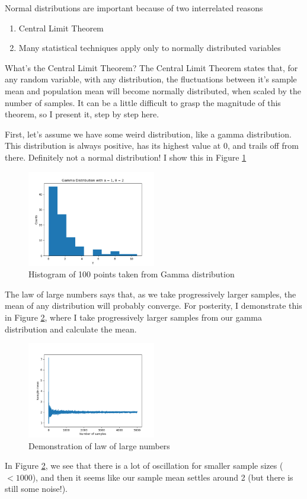 \documentclass{article}
\begin{document}
\clearpage
Normal distributions are important because of two interrelated reasons
\begin{enumerate}
\item\label{item:3} Central Limit Theorem
\item Many statistical techniques apply only to normally distributed variables
\end{enumerate}

What's the Central Limit Theorem? The Central Limit Theorem states that, for any random variable, with any distribution, the fluctuations between it's sample mean and population mean will become normally distributed, when scaled by the number of samples. It can be a little difficult to grasp the magnitude of this theorem, so I present it, step by step here. 

First, let's assume we have some weird distribution, like a gamma distribution. This distribution is always positive, has its highest value at 0, and trails off from there. Definitely not a normal distribution! I show this in Figure \ref{fig:gamma}
\begin{figure}[htbp]
\centerline{\includegraphics[width = 0.5\textwidth]{gamma.png}}
\caption[]{\label{fig:gamma} Histogram of 100 points taken from Gamma distribution}
\end{figure}

The law of large numbers says that, as we take progressively larger samples, the mean of any distribution will probably converge. For posterity, I demonstrate this in Figure \ref{fig:lawoflarge}, where I take progressively larger samples from our gamma distribution and calculate the mean.
\begin{figure}[htbp]
\centerline{\includegraphics[width = 0.5\textwidth]{lawoflarge.png}}
\caption[]{\label{fig:lawoflarge} Demonstration of law of large numbers}
\end{figure}
In Figure \ref{fig:lawoflarge}, we see that there is a lot of oscillation for smaller sample sizes ($<1000$), and then it seems like our sample mean settles around 2 (but there is still some noise!).
\end{document}
